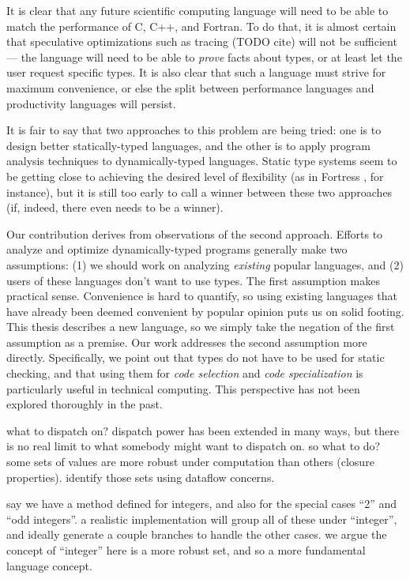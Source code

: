 It is clear that any future scientific computing language will need to be able to
match the performance of C, C++, and Fortran. To do that, it is almost certain
that speculative optimizations such as tracing (TODO cite) will not be sufficient ---
the language will need to be able to \emph{prove} facts about types, or at least
let the user request specific types. It is also clear that such a language must
strive for maximum convenience, or else the split between performance languages
and productivity languages will persist.

It is fair to say that two approaches to this problem are being tried: one is
to design better statically-typed languages, and the other is to apply
program analysis techniques to dynamically-typed languages.
Static type systems seem to be getting close to achieving the desired level
of flexibility (as in Fortress \cite{fortresspec}, for instance), but it
is still too early to call a winner between these two approaches
(if, indeed, there even needs to be a winner).

Our contribution derives from observations of the second approach.
Efforts to analyze and optimize dynamically-typed programs generally make two
assumptions: (1) we should work on analyzing \emph{existing} popular
languages, and (2) users of these languages don't want to use types.
The first assumption makes practical sense.
Convenience is hard to quantify, so using existing languages that have already
been deemed convenient by popular opinion puts us on solid footing.
This thesis describes a new language, so we simply take the negation of the
first assumption as a premise.
Our work addresses the second assumption more directly.
Specifically, we point out that types do not have to be used for
static checking, and that using them for \emph{code selection} and
\emph{code specialization} is particularly useful in technical computing.
This perspective has not been explored thoroughly in the past.



what to dispatch on? dispatch power has been extended in many ways, but
there is no real limit to what somebody might want to dispatch on.
so what to do?
some sets of values are more robust under computation than others
(closure properties).
identify those sets using dataflow concerns.

say we have a method defined for integers, and also for the special cases
``2'' and ``odd integers''. a realistic implementation
will group all of these under ``integer'', and ideally generate a couple
branches to handle the other cases. we argue the concept of ``integer''
here is a more robust set, and so a more fundamental language concept.


